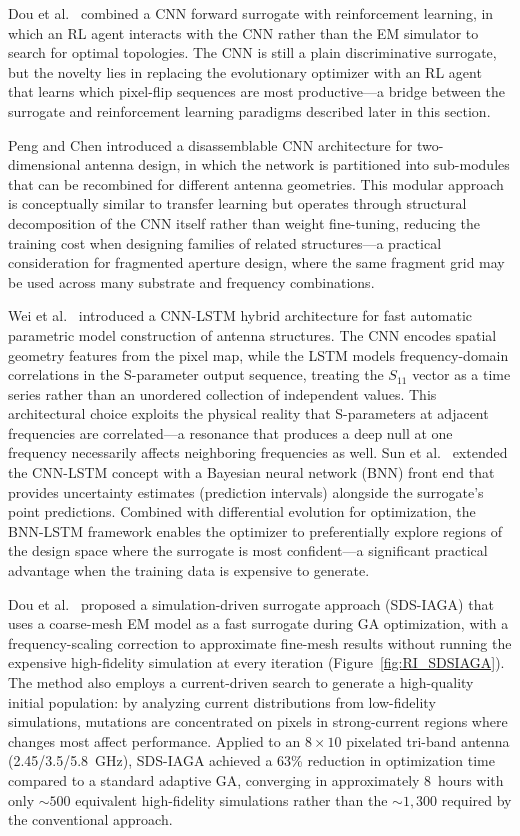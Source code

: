 Dou et al.\ \cite{Dou2025CNN} combined a CNN forward surrogate with reinforcement learning, in which an RL agent interacts with the CNN rather than the EM simulator to search for optimal topologies.  The CNN is still a plain discriminative surrogate, but the novelty lies in replacing the evolutionary optimizer with an RL agent that learns which pixel-flip sequences are most productive---a bridge between the surrogate and reinforcement learning paradigms described later in this section.

Peng and Chen \cite{Peng2024Disassemblable} introduced a disassemblable CNN architecture for two-dimensional antenna design, in which the network is partitioned into sub-modules that can be recombined for different antenna geometries.  This modular approach is conceptually similar to transfer learning but operates through structural decomposition of the CNN itself rather than weight fine-tuning, reducing the training cost when designing families of related structures---a practical consideration for fragmented aperture design, where the same fragment grid may be used across many substrate and frequency combinations.

Wei et al.\ \cite{Wei2024CNNLSTM} introduced a CNN-LSTM hybrid architecture for fast automatic parametric model construction of antenna structures.  The CNN encodes spatial geometry features from the pixel map, while the LSTM models frequency-domain correlations in the S-parameter output sequence, treating the $S_{11}$ vector as a time series rather than an unordered collection of independent values.  This architectural choice exploits the physical reality that S-parameters at adjacent frequencies are correlated---a resonance that produces a deep null at one frequency necessarily affects neighboring frequencies as well.  Sun et al.\ \cite{Sun2024BNNLSTM} extended the CNN-LSTM concept with a Bayesian neural network (BNN) front end that provides uncertainty estimates (prediction intervals) alongside the surrogate's point predictions.  Combined with differential evolution for optimization, the BNN-LSTM framework enables the optimizer to preferentially explore regions of the design space where the surrogate is most confident---a significant practical advantage when the training data is expensive to generate.

Dou et al.\ \cite{Dou2024SurrogateAGA} proposed a simulation-driven surrogate approach (SDS-IAGA) that uses a coarse-mesh EM model as a fast surrogate during GA optimization, with a frequency-scaling correction to approximate fine-mesh results without running the expensive high-fidelity simulation at every iteration (Figure~\ref{fig:RI_SDSIAGA}).  The method also employs a current-driven search to generate a high-quality initial population: by analyzing current distributions from low-fidelity simulations, mutations are concentrated on pixels in strong-current regions where changes most affect performance.  Applied to an $8 \times 10$ pixelated tri-band antenna (2.45/3.5/5.8~GHz), SDS-IAGA achieved a 63\% reduction in optimization time compared to a standard adaptive GA, converging in approximately 8~hours with only $\sim\!500$ equivalent high-fidelity simulations rather than the $\sim\!1{,}300$ required by the conventional approach.

